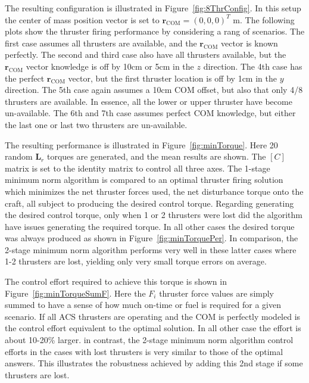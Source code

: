 The resulting configuration is illustrated in Figure~\ref{fig:8ThrConfig}.  In this setup the center of mass position vector is set to $\bm r_{\text{COM}} = (0,0,0)^{T} \text{ m}$.  The following plots show the thruster firing performance by considering a rang of scenarios.  The first case assumes all thrusters are available, and the $\bm r_{\text{COM}}$ vector is known perfectly.  The second and third case also have all thrusters available, but the $\bm r_{\text{COM}}$ vector knowledge is off by 10cm or 5cm in the $z$ direction.  The 4th case has the perfect $\bm r_{\text{COM}}$ vector, but the first thruster location is off by 1cm in the $y$ direction.  The 5th case again assumes a 10cm COM offset, but also that only 4/8 thrusters are available.  In essence, all the lower or upper thruster have become un-available.  The 6th and 7th case assumes perfect COM knowledge, but either the last one or last two thrusters are un-available.  


The resulting performance is illustrated in Figure~\ref{fig:minTorque}.  Here 20 random $\bm L_{r}$ torques are generated, and the mean results are shown.  The $[C]$ matrix is set to the identity matrix to control all three axes.   The 1-stage minimum norm algorithm is compared to an optimal thruster firing solution which minimizes the net thruster forces used, the net disturbance torque onto the craft, all subject to producing the desired control torque.    Regarding generating the desired control torque, only when 1 or 2 thrusters were lost did the algorithm have issues generating the required torque.  In all other cases the desired torque was always produced as shown in Figure~\ref{fig:minTorquePer}.  In comparison, the 2-stage minimum norm algorithm performs very well in these latter cases where 1-2 thrusters are lost, yielding only very small torque errors on average.  

The control effort required to achieve this torque is shown in Figure~\ref{fig:minTorqueSumF}.  Here the $F_{i}$ thruster force values are simply summed to have a sense of how much on-time or fuel is required for a given scenario.  If all ACS thrusters are operating and the COM is perfectly modeled is the control effort equivalent to the optimal solution.  In all other case the effort is about 10-20\% larger.  in contrast, the 2-stage minimum norm algorithm control efforts in the cases with lost thrusters is very similar to those of the optimal answers.  This illustrates the robustness achieved by adding this 2nd stage if some thrusters are lost.  

